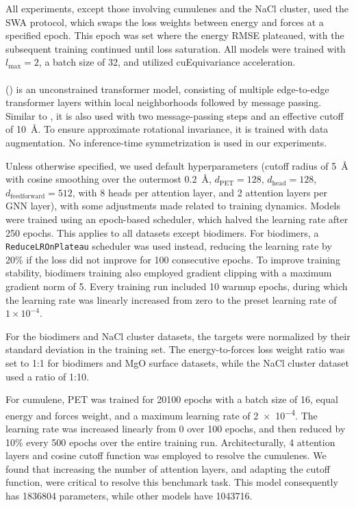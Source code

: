 \documentclass[10pt]{article}
\begin{document}
All experiments, except those involving cumulenes and the NaCl cluster, used the SWA protocol, which swaps the loss weights between energy and forces at a specified epoch. This epoch was set where the energy RMSE plateaued, with the subsequent training continued until loss saturation. All models were trained with $l_{\text{max}} = 2$, a batch size of 32, and utilized cuEquivariance acceleration.


\paragraph{\pet}
\pet (\cite{pc2023}) is an unconstrained transformer model, consisting of multiple edge-to-edge transformer layers within local neighborhoods followed by message passing. Similar to \mace, it is also used with two message-passing steps and an effective cutoff of \qty{10}{\angstrom}. To ensure approximate rotational invariance, it is trained with data augmentation. No inference-time symmetrization is used in our experiments.

Unless otherwise specified, we used default hyperparameters (cutoff radius of \qty{5}{\angstrom} with cosine smoothing over the outermost \qty{0.2}{\angstrom}, $d_{\text{PET}}=128$, $d_{\text{head}}=128$, $d_{\text{feedforward}}=512$, with 8 heads per attention layer, and 2 attention layers per GNN layer), with some adjustments made related to training dynamics. Models were trained using an epoch-based scheduler, which halved the learning rate after 250 epochs. This applies to all datasets except biodimers. For biodimers, a \texttt{ReduceLROnPlateau} scheduler was used instead, reducing the learning rate by 20\% if the loss did not improve for 100 consecutive epochs. To improve training stability, biodimers training also employed gradient clipping with a maximum gradient norm of 5. Every training run included 10 warmup epochs, during which the learning rate was linearly increased from zero to the preset learning rate of $1 \times 10^{-4}$.

For the biodimers and NaCl cluster datasets, the targets were normalized by their standard deviation in the training set. The energy-to-forces loss weight ratio was set to 1:1 for biodimers and MgO surface datasets, while the NaCl cluster dataset used a ratio of 1:10.

For cumulene, PET was trained for \num{20100} epochs with a batch size of \num{16}, equal energy and forces weight, and a maximum learning rate of \num{2e-4}. The learning rate was increased linearly from \num{0} over 100 epochs, and then reduced by 10\% every 500 epochs over the entire training run. Architecturally, \num{4} attention layers and cosine cutoff function was employed to resolve the cumulenes. We found that increasing the number of attention layers, and adapting the cutoff function, were critical to resolve this benchmark task. This \pet model consequently has \num{1836804} parameters, while other models have \num{1043716}.
\end{document}
